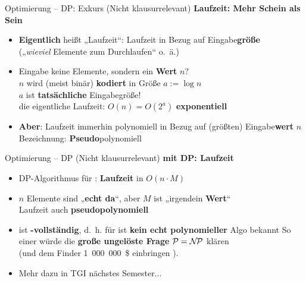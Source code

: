 \begin{frame}{Optimierung – DP: Exkurs {\footnotesize (Nicht klausurrelevant)}}
	\textbf{Laufzeit: Mehr Schein als Sein} 
	\begin{itemize}
		\item \textbf{Eigentlich} heißt „Laufzeit“: Laufzeit in Bezug auf Eingabe\textbf{größe} \\
		{\small („\textit{wieviel} Elemente zum Durchlaufen“ o.~ä.)}
		\pause
		\item Eingabe keine Elemente, sondern ein \textbf{Wert} $n$? \\
		 $n$ wird (meist binär) \textbf{kodiert} in Größe $a := \log n$ \\ 
		 \impl $a$ ist \textbf{tatsächliche} Eingabegröße! \\
		 \impl die eigentliche Laufzeit: $O(n) = O(2^a)$ \impl \textbf{exponentiell}
		\pause
		\item \textbf{Aber}: Laufzeit immerhin polynomiell in Bezug auf {\small (größten)} Eingabe\textbf{wert} $n$ \impl Bezeichnung: \textbf{Pseudo}polynomiell \\
	\end{itemize}
\end{frame}

\begin{frame}{Optimierung – DP {\footnotesize (Nicht klausurrelevant)}}
	\textbf{\Knapsack mit DP: Laufzeit} 
	\begin{itemize}
		\item DP-Algorithmus für \Knapsack: \textbf{Laufzeit} in $O(n \cdot M)$
		\item $n$ Elemente sind „\textbf{echt da}“, aber $M$ ist „irgendein \textbf{Wert}“ \\
		\impl Laufzeit auch \textbf{pseudopolynomiell}
		\pause
		\item \Knapsack ist \textbf{\NP-vollständig}, d.~h. für \Knapsack ist \textbf{kein echt polynomieller} Algo bekannt
		\pause
		\implitem So einer würde die \textbf{große ungelöste Frage} $\mathcal{P} = \mathcal{N\hspace{-1.5pt}P}$ klären \\ 
		(und dem Finder 1~000~000~\$ einbringen \smiley).
		\pause
		\item Mehr dazu in TGI nächstes Semester...
	\end{itemize}
\end{frame}


